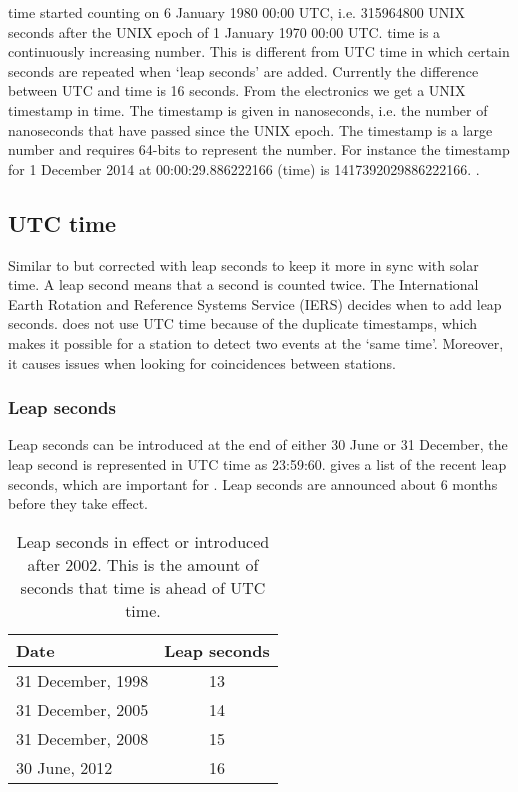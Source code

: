 \gps time started counting on 6 January 1980 00:00 UTC, i.e.
\num{315964800} UNIX seconds after the UNIX epoch of 1 January 1970
00:00 UTC. \gps time is a continuously increasing number. This is
different from UTC time in which certain seconds are repeated when `leap
seconds' are added. Currently the difference between UTC and \gps time
is 16 seconds. From the \hisparc electronics we get a UNIX timestamp in
\gps time. The timestamp is given in nanoseconds, i.e. the number of
nanoseconds that have passed since the UNIX epoch. The \gps timestamp is
a large number and requires 64-bits to represent the number. For
instance the \gps timestamp for 1 December 2014 at 00:00:29.886222166
(\gps time) is \num{1417392029886222166}. \cite{usno:2012aa}.


\subsection{UTC time}

Similar to \gps but corrected with leap seconds to keep it more in sync
with solar time. A leap second means that a second is counted twice. The
International Earth Rotation and Reference Systems Service (IERS)
decides when to add leap seconds. \hisparc does not use UTC time because
of the duplicate timestamps, which makes it possible for a station to
detect two events at the `same time'. Moreover, it causes issues when
looking for coincidences between stations.


\subsubsection{Leap seconds}

Leap seconds can be introduced at the end of either 30 June or 31
December, the leap second is represented in UTC time as 23:59:60.
 gives a list of the recent leap seconds,
which are important for \hisparc. Leap seconds are announced about 6
months before they take effect.

\begin{table}
    \centering
    \begin{tabular}{ l | c }
        Date & Leap seconds \\
        \hline
        31 December, 1998 & 13 \\
        31 December, 2005 & 14 \\
        31 December, 2008 & 15 \\
        30 June, 2012 & 16 \\
        \hline
    \end{tabular}
   \caption{Leap seconds in effect or introduced after 2002. This is the
            amount of seconds that \gps time is ahead of UTC time.}
   \label{table:leapseconds}
\end{table}


